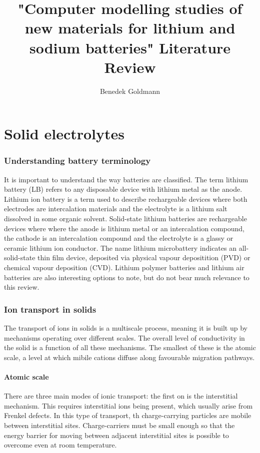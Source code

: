 \documentclass[10pt,a4paper, titlepage]{article}
\title{"Computer modelling studies of new materials for lithium and sodium batteries" Literature Review}
\author{Benedek Goldmann}
\begin{document}
\maketitle
\tableofcontents
\clearpage

\part{Solid electrolytes}

\section{Understanding battery terminology}

It is important to understand the way batteries are classified.
The term lithium battery (LB) refers to any disposable device with lithium metal as the anode.
Lithium ion battery is a term used to describe rechargeable devices where both electrodes are intercalation materials and the electrolyte is a lithium salt dissolved in some organic solvent.
Solid-state lithium batteries are rechargeable devices where where the anode is lithium metal or an intercalation compound, the cathode is an intercalation compound and the electrolyte is a glassy or ceramic lithium ion conductor.
The name lithium microbattery indicates an all-solid-state thin film device, deposited via physical vapour depositition (PVD) or chemical vapour deposition (CVD).
Lithium polymer batteries and lithium air batteries are also interesting options to note, but do not bear much relevance to this review. \cite{RN9}

\section{Ion transport in solids}

The transport of ions in solids is a multiscale process, meaning it is built up by mechanisms operating over different scales. 
The overall level of conductivity in the solid is a function of all these mechanisms. \cite{RN1} 
The smallest of these is the atomic scale, a level at which mibile cations diffuse along favourable migration pathways.

\subsection{Atomic scale}

There are three main modes of ionic transport: the first on is the interstitial mechanism. 
This requires interstitial ions being present, which usually arise from Frenkel defects. 
In this type of transport, th charge-carrying particles are mobile between interstitial sites. 
Charge-carriers must be small enough so that the energy barrier for moving between adjacent interstitial sites is possible to overcome even at room temperature.
\end{document}
